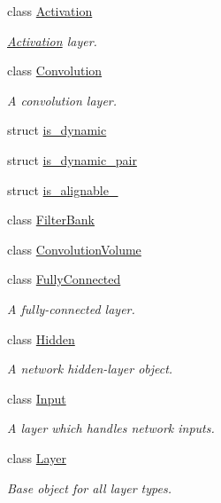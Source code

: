 \begin{DoxyCompactItemize}
\item 
class \hyperlink{classffnn_1_1layer_1_1_activation}{Activation}
\begin{DoxyCompactList}\small\item\em \hyperlink{classffnn_1_1layer_1_1_activation}{Activation} layer. \end{DoxyCompactList}\item 
class \hyperlink{classffnn_1_1layer_1_1_convolution}{Convolution}
\begin{DoxyCompactList}\small\item\em A convolution layer. \end{DoxyCompactList}\item 
struct \hyperlink{structffnn_1_1layer_1_1is__dynamic}{is\-\_\-dynamic}
\item 
struct \hyperlink{structffnn_1_1layer_1_1is__dynamic__pair}{is\-\_\-dynamic\-\_\-pair}
\item 
struct \hyperlink{structffnn_1_1layer_1_1is__alignable__128}{is\-\_\-alignable\-\_}
\item 
class \hyperlink{classffnn_1_1layer_1_1_filter_bank}{Filter\-Bank}
\item 
class \hyperlink{classffnn_1_1layer_1_1_convolution_volume}{Convolution\-Volume}
\item 
class \hyperlink{classffnn_1_1layer_1_1_fully_connected}{Fully\-Connected}
\begin{DoxyCompactList}\small\item\em A fully-\/connected layer. \end{DoxyCompactList}\item 
class \hyperlink{classffnn_1_1layer_1_1_hidden}{Hidden}
\begin{DoxyCompactList}\small\item\em A network hidden-\/layer object. \end{DoxyCompactList}\item 
class \hyperlink{classffnn_1_1layer_1_1_input}{Input}
\begin{DoxyCompactList}\small\item\em A layer which handles network inputs. \end{DoxyCompactList}\item 
class \hyperlink{classffnn_1_1layer_1_1_layer}{Layer}
\begin{DoxyCompactList}\small\item\em Base object for all layer types. \end{DoxyCompactList}\item 

\end{DoxyCompactItemize}
